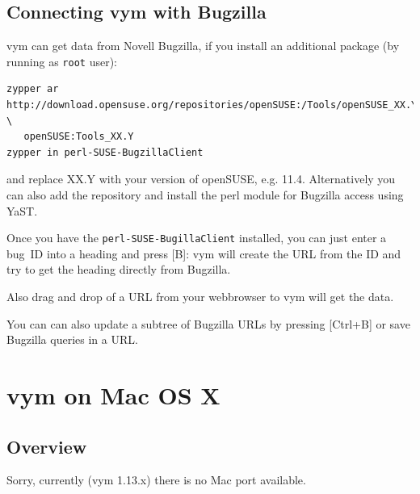 \documentclass[12pt,a4paper]{article}
\newcommand{\vym}{{\sc vym }}
\newcommand{\key}[1]{[#1]}
\begin{document}
\subsection{Connecting \vym with Bugzilla}  \label{bugzilla}
\vym can get data from Novell Bugzilla, if you install an
additional package (by running as {\tt root} user):

\begin{verbatim}
zypper ar
http://download.opensuse.org/repositories/openSUSE:/Tools/openSUSE_XX.Y/ \
   openSUSE:Tools_XX.Y
zypper in perl-SUSE-BugzillaClient
\end{verbatim}
and replace XX.Y with your version of openSUSE, e.g. 11.4.
Alternatively you can also add the repository
and install the perl module for Bugzilla access using YaST.

Once you have the {\tt perl-SUSE-BugillaClient} installed, you can just
enter a bug\ ID into a heading and press \key{B}: \vym will create the
URL from the ID and try to get the heading directly from Bugzilla.

Also drag and drop of a URL from your webbrowser to \vym will get the
data.

You can can also update a subtree of Bugzilla URLs by pressing
\key{Ctrl+B} or save Bugzilla queries in a URL.


\section{\vym on Mac OS X}
\subsection{Overview}
Sorry, currently (\vym 1.13.x) there is no Mac port available.

    
\end{document}
